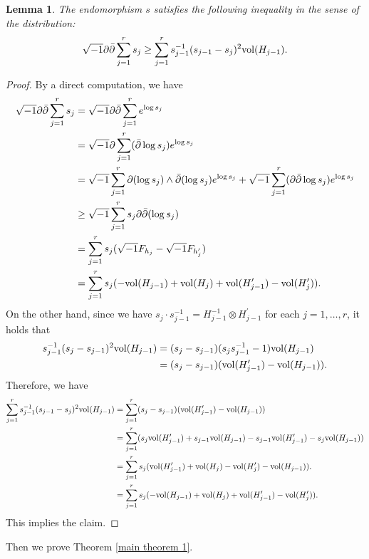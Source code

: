 \documentclass[12pt]{article}
\theoremstyle{definition}
\newtheorem{lemm}[defi]{Lemma}
\def\vol{{\rm vol}}
\def\inum{{\sqrt{-1}}}
\begin{document}
\begin{lemm}\label{ddbars}{\it The endomorphism $s$ satisfies the following inequality in the sense of the distribution:
\begin{align}
\inum\partial\bar{\partial} \sum_{j=1}^rs_j\geq \sum_{j=1}^rs_{j-1}^{-1}(s_{j-1}-s_j)^2\vol(H_{j-1}). \label{s}
\end{align}
}
\end{lemm}
\begin{proof} By a direct computation, we have
\begin{align*}
\inum\partial \bar{\partial} \sum_{j=1}^rs_j&= \inum\partial \bar{\partial}\sum_{j=1}^re^{\log s_j} \\
&= \inum \partial \sum_{j=1}^r(\bar{\partial}\log s_j) e^{\log s_j} \\
&= \inum \sum_{j=1}^r\partial (\log s_j)\wedge\bar{\partial}(\log s_j) e^{\log s_j}+\inum\sum_{j=1}^r(\partial \bar{\partial} \log s_j )e^{\log s_j} \\
&\geq \inum \sum_{j=1}^rs_j\partial \bar{\partial}(\log s_j) \\
&=\sum_{j=1}^rs_j(\inum F_{h_j}-\inum F_{h_j^\prime}) \\
&=\sum_{j=1}^rs_j(-\vol(H_{j-1})+\vol(H_j)+\vol(H_{j-1}^\prime)-\vol(H_j^\prime)). 
\end{align*}
On the other hand, since we have $s_j\cdot s_{j-1}^{-1}=H_{j-1}^{-1}\otimes H_{j-1}^\prime$ for each $j=1,\dots, r$, it holds that
\begin{align*}
s_{j-1}^{-1}(s_j-s_{j-1})^2\vol(H_{j-1})&=(s_j-s_{j-1})(s_js_{j-1}^{-1}-1)\vol(H_{j-1}) \\
&=(s_j-s_{j-1})(\vol(H_{j-1}^\prime)-\vol(H_{j-1})).
\end{align*}
Therefore, we have
\begin{align*}
\sum_{j=1}^rs_{j-1}^{-1}(s_{j-1}-s_j)^2\vol(H_{j-1}) 
&=\sum_{j=1}^r(s_j-s_{j-1})(\vol(H_{j-1}^\prime)-\vol(H_{j-1})) \\
&=\sum_{j=1}^r(s_j\vol(H_{j-1}^\prime)+s_{j-1}\vol(H_{j-1})-s_{j-1}\vol(H_{j-1}^\prime)-s_j\vol (H_{j-1})) \\
&=\sum_{j=1}^rs_j(\vol(H_{j-1}^\prime)+\vol(H_j)-\vol(H_j^\prime)-\vol(H_{j-1})). \\
&=\sum_{j=1}^rs_j(-\vol(H_{j-1})+\vol(H_j)+\vol(H_{j-1}^\prime)-\vol(H_j^\prime)). 
\end{align*}
This implies the claim.
\end{proof}
Then we prove Theorem \ref{main theorem 1}.
\end{document}
